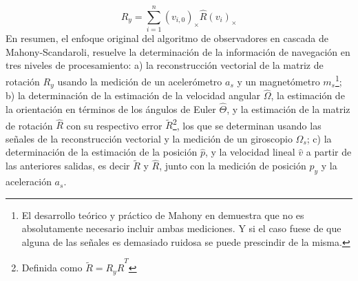 \documentclass[conference]{IEEEtran}
\begin{document}
\begin{equation}\label{ReconstruccionVectorial}
R_y=\sum_{i=1}^{n}(v_{i,0})_\times\hat{R}(v_i)_\times
\end{equation}
En resumen, el enfoque original del algoritmo de observadores en cascada de Mahony-Scandaroli, resuelve la determinación de la información de navegación en tres niveles de procesamiento:
a) la reconstrucción vectorial de la matriz de rotación $R_y$ usando la medición de un acelerómetro $a_s$ y un magnetómetro $m_s$\footnote{El desarrollo teórico y práctico de Mahony en \cite{Mahony2008} demuestra que no es absolutamente necesario incluir ambas mediciones. Y si el caso fuese de que alguna de las señales es demasiado ruidosa se puede prescindir de la misma.}; b) la determinación de la estimación de la velocidad angular $\hat{\Omega}$, la estimación de la orientación en términos de los ángulos de Euler $\hat{\Theta}$, y la estimación de la matriz de rotación $\hat{R}$ con su respectivo error $\tilde{R}$\footnote{Definida como $\tilde{R}=R_y\hat{R}^T$}, los que se determinan usando las señales de la reconstrucción vectorial y la medición de un giroscopio $\Omega_s$; c) la determinación de la estimación de la posición $\hat{p}$, y la velocidad lineal $\hat{v}$ a partir de las anteriores salidas, es decir $\tilde{R}$ y $\hat{R}$, junto con la medición de posición $p_y$ y la aceleración $a_s$. 
\end{document}
